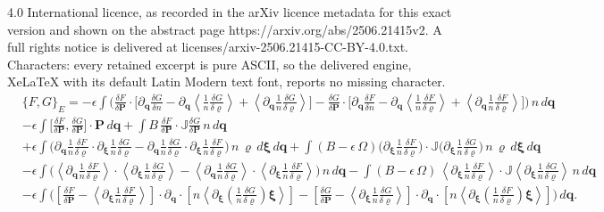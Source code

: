 \documentclass[10pt,a4paper]{amsart}
\begin{document}
4.0 International licence, as recorded in the arXiv licence metadata for this exact version and shown on the abstract page https://arxiv.org/abs/2506.21415v2. A full rights notice is delivered at licenses/arxiv-2506.21415-CC-BY-4.0.txt. Characters: every retained excerpt is pure ASCII, so the delivered engine, XeLaTeX with its default Latin Modern text font, reports no missing character.
\begin{align}
&\{F,G\}_{E} =-\epsilon\int\bigg(\frac{\delta F}{\delta\bm{P}}\cdot \bigg[\partial_{\bm{q}}\frac{\delta G}{\delta n} - \partial_{\bm{q}}\left\langle\frac{1}{n}\frac{\delta G}{\delta\varrho}\right\rangle + \left\langle\partial_{\bm{q}}\frac{1}{n}\frac{\delta G}{\delta\varrho}\right\rangle\bigg]-\frac{\delta G}{\delta\bm{P}}\cdot \bigg[\partial_{\bm{q}}\frac{\delta F}{\delta n} - \partial_{\bm{q}}\left\langle\frac{1}{n}\frac{\delta F}{\delta\varrho}\right\rangle + \left\langle\partial_{\bm{q}}\frac{1}{n}\frac{\delta F}{\delta\varrho}\right\rangle\bigg]\bigg)\,n\,d\bm{q}\nonumber\\
%
&-\epsilon\int\bigg[\frac{\delta F}{\delta\bm{P}},\frac{\delta G}{\delta\bm{P}}\bigg]\cdot\bm{P}\,d\bm{q} +\int B\,\frac{\delta F}{\delta\bm{P}}\cdot \mathbb{J}\frac{\delta G}{\delta\bm{P}} \,n\,d\bm{q}\nonumber\\
&+\epsilon\int \bigg(\partial_{\bm{q}}\frac{1}{n}\frac{\delta F}{\delta \varrho}\cdot \partial_{\bm{\xi}}\frac{1}{n}\frac{\delta G}{\delta\varrho} -\partial_{\bm{q}}\frac{1}{n}\frac{\delta G}{\delta \varrho}\cdot \partial_{\bm{\xi}}\frac{1}{n}\frac{\delta F}{\delta\varrho} \bigg)\,n\,\varrho\,d\bm{\xi}\,d\bm{q} + \int (B-\epsilon\,\Omega)\bigg(\partial_{\bm{\xi}}\frac{1}{n}\frac{\delta F}{\delta\varrho}\bigg)\cdot\mathbb{J}\bigg(\partial_{\bm{\xi}}\frac{1}{n}\frac{\delta G}{\delta\varrho}\bigg)\,n\,\varrho\,d\bm{\xi}\,d\bm{q}\nonumber\\
&-\epsilon\int \bigg(\left\langle\partial_{\bm{q}}\frac{1}{n}\frac{\delta F}{\delta\varrho}\right\rangle\cdot\left\langle\partial_{\bm{\xi}}\frac{1}{n}\frac{\delta G}{\delta\varrho}\right\rangle-\left\langle\partial_{\bm{q}}\frac{1}{n}\frac{\delta G}{\delta\varrho}\right\rangle\cdot\left\langle\partial_{\bm{\xi}}\frac{1}{n}\frac{\delta F}{\delta\varrho}\right\rangle\bigg)\,n\,d\bm{q}-\int (B-\epsilon\,\Omega)\, \left\langle\partial_{\bm{\xi}}\frac{1}{n}\frac{\delta F}{\delta\varrho}\right\rangle\cdot \mathbb{J} \left\langle\partial_{\bm{\xi}}\frac{1}{n}\frac{\delta G}{\delta\varrho}\right\rangle\,n\,d\bm{q}\nonumber\\
&- \epsilon \int \bigg(\left[\frac{\delta F}{\delta\bm{P}} - \left\langle\partial_{\bm{\xi}}\frac{1}{n}\frac{\delta F}{\delta\varrho}\right\rangle\right]\cdot\partial_{\bm{q}}\cdot\left[n\left\langle\partial_{\bm{\xi}}\left(\frac{1}{n}\frac{\delta G}{\delta\varrho}\right)\bm{\xi}\right\rangle\right] -\left[\frac{\delta G}{\delta\bm{P}} - \left\langle\partial_{\bm{\xi}}\frac{1}{n}\frac{\delta G}{\delta\varrho}\right\rangle\right]\cdot\partial_{\bm{q}}\cdot\left[n\left\langle\partial_{\bm{\xi}}\left(\frac{1}{n}\frac{\delta F}{\delta\varrho}\right)\bm{\xi}\right\rangle\right] \bigg)\,d\bm{q}.\label{VP_cbracket}
\end{align}
\end{document}
